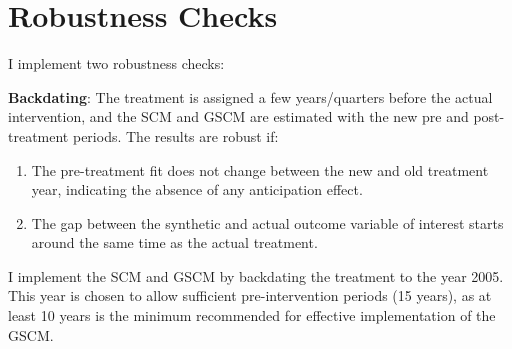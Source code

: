 \documentclass[12pt,nobind, a4paper]{reedthesis}
\begin{document}
 \hypertarget{robustness-checks}{%
 \section{Robustness Checks}\label{robustness-checks}}

 I implement two robustness checks:

 \textbf{Backdating}: The treatment is assigned a few years/quarters before the actual intervention, and the SCM and GSCM are estimated with the new pre and post-treatment periods. The results are robust if:
 \begin{enumerate}
 \def\labelenumi{\alph{enumi}.}
 \item
   The pre-treatment fit does not change between the new and old treatment year, indicating the absence of any anticipation effect.
 \item
   The gap between the synthetic and actual outcome variable of interest starts around the same time as the actual treatment.
   \linebreak
 \end{enumerate}
 I implement the SCM and GSCM by backdating the treatment to the year 2005. This year is chosen to allow sufficient pre-intervention periods (15 years), as at least 10 years is the minimum recommended for effective implementation of the GSCM.
\end{document}
